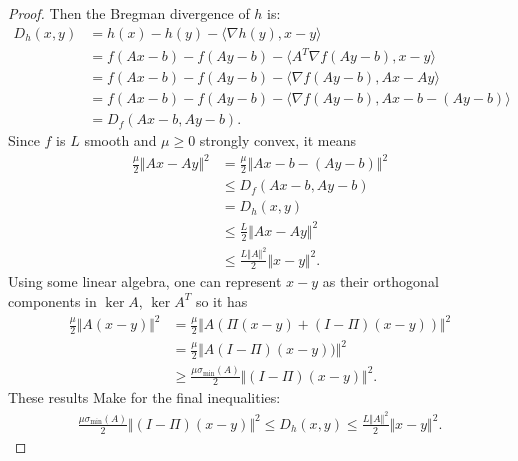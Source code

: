 \documentclass[12pt]{article}
\begin{document}
        \begin{proof}
            Then the Bregman divergence of $h$ is: 
            \begin{align*}
                D_h(x, y) &= h(x) - h(y) - \langle \nabla h(y), x - y\rangle
                \\
                &= f(Ax - b) - f(Ay - b) - \langle A^T\nabla f(Ay - b), x - y\rangle
                \\
                &= f(Ax - b) - f(Ay - b) - \langle \nabla f(Ay - b), Ax - Ay\rangle
                \\
                &= f(Ax - b) - f(Ay - b) - \langle \nabla f(Ay - b), Ax - b - (Ay - b)\rangle
                \\
                &= D_f(Ax - b, Ay - b). 
            \end{align*}
            Since $f$ is $L$ smooth and $\mu \ge 0$ strongly convex, it means 
            \begin{align*}
                \frac{\mu}{2}\Vert Ax - Ay\Vert^2
                &= 
                \frac{\mu}{2}\Vert Ax - b - (Ay - b)\Vert^2 
                \\
                &\le D_f(Ax - b, Ay - b)
                \\
                &= D_h(x, y) 
                \\
                &\le \frac{L}{2} \Vert Ax - Ay\Vert^2
                \\
                &\le \frac{L\Vert A\Vert^2}{2} \Vert x - y\Vert^2. 
            \end{align*}
            Using some linear algebra, one can represent $x - y$ as their orthogonal components in $\ker A$, $\ker A^T$ so it has 
            \begin{align*}
                \frac{\mu}{2}\Vert A(x - y)\Vert^2 &= 
                \frac{\mu}{2}\Vert A(\Pi(x - y) + (I - \Pi)(x - y))\Vert^2
                \\
                &= 
                \frac{\mu}{2}\Vert A(I - \Pi)(x - y))\Vert^2
                \\
                &\ge \frac{\mu\sigma_{\min}(A)}{2}\Vert (I - \Pi)(x - y)\Vert^2. 
            \end{align*}
            These results Make for the final inequalities: 
            \begin{align*}
                \frac{\mu\sigma_{\min}(A)}{2}\Vert (I - \Pi)(x - y)\Vert^2
                \le 
                D_h(x, y) \le 
                \frac{L\Vert A\Vert^2}{2}\Vert x - y\Vert^2. 
            \end{align*}
        \end{proof}
        \begin{theorem}
        \end{theorem}
\end{document}

